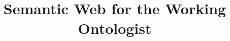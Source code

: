 \documentclass[times]{acm-book}%
\title{Semantic Web for the Working Ontologist}
\begin{document}
\newenvironment{challenge}[1][]{\refstepcounter{challenge}\par\medskip
   \textbf{CHALLENGE \thechallenge} \rmfamily}{\medskip}

\newenvironment{solution}[1][]{\textbf{SOLUTION}}

\renewcommand{\star}{{}}

\newenvironment{example}[1][]{\refstepcounter{example}\par\medskip
   \textbf{Example~\theexample. #1} \rmfamily}{\medskip}

\frontmatter

\mainmatter

















\backmatter

\end{document}
